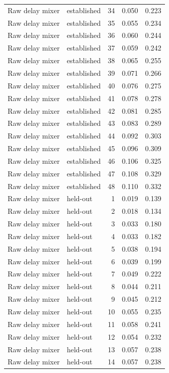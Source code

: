 \begin{tabular}{llrrr}
Raw delay mixer & established & 34 & 0.050 & 0.223 \\
Raw delay mixer & established & 35 & 0.055 & 0.234 \\
Raw delay mixer & established & 36 & 0.060 & 0.244 \\
Raw delay mixer & established & 37 & 0.059 & 0.242 \\
Raw delay mixer & established & 38 & 0.065 & 0.255 \\
Raw delay mixer & established & 39 & 0.071 & 0.266 \\
Raw delay mixer & established & 40 & 0.076 & 0.275 \\
Raw delay mixer & established & 41 & 0.078 & 0.278 \\
Raw delay mixer & established & 42 & 0.081 & 0.285 \\
Raw delay mixer & established & 43 & 0.083 & 0.289 \\
Raw delay mixer & established & 44 & 0.092 & 0.303 \\
Raw delay mixer & established & 45 & 0.096 & 0.309 \\
Raw delay mixer & established & 46 & 0.106 & 0.325 \\
Raw delay mixer & established & 47 & 0.108 & 0.329 \\
Raw delay mixer & established & 48 & 0.110 & 0.332 \\
Raw delay mixer & held-out & 1 & 0.019 & 0.139 \\
Raw delay mixer & held-out & 2 & 0.018 & 0.134 \\
Raw delay mixer & held-out & 3 & 0.033 & 0.180 \\
Raw delay mixer & held-out & 4 & 0.033 & 0.182 \\
Raw delay mixer & held-out & 5 & 0.038 & 0.194 \\
Raw delay mixer & held-out & 6 & 0.039 & 0.199 \\
Raw delay mixer & held-out & 7 & 0.049 & 0.222 \\
Raw delay mixer & held-out & 8 & 0.044 & 0.211 \\
Raw delay mixer & held-out & 9 & 0.045 & 0.212 \\
Raw delay mixer & held-out & 10 & 0.055 & 0.235 \\
Raw delay mixer & held-out & 11 & 0.058 & 0.241 \\
Raw delay mixer & held-out & 12 & 0.054 & 0.232 \\
Raw delay mixer & held-out & 13 & 0.057 & 0.238 \\
Raw delay mixer & held-out & 14 & 0.057 & 0.238 \\

\end{tabular}

